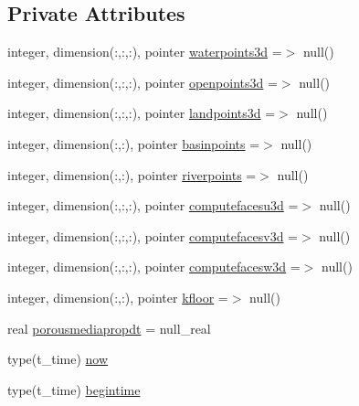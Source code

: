 \subsection*{Private Attributes}
\begin{DoxyCompactItemize}
\item 
integer, dimension(\+:,\+:,\+:), pointer \mbox{\hyperlink{structmoduleporousmediaproperties_1_1t__extvar_a78329eea7d2b60358e14da7512fa68bc}{waterpoints3d}} =$>$ null()
\item 
integer, dimension(\+:,\+:,\+:), pointer \mbox{\hyperlink{structmoduleporousmediaproperties_1_1t__extvar_ab5599d3df3801a6a22dce6e4331dbeac}{openpoints3d}} =$>$ null()
\item 
integer, dimension(\+:,\+:,\+:), pointer \mbox{\hyperlink{structmoduleporousmediaproperties_1_1t__extvar_aead11455a918c9ba540a3c1712b14219}{landpoints3d}} =$>$ null()
\item 
integer, dimension(\+:,\+:), pointer \mbox{\hyperlink{structmoduleporousmediaproperties_1_1t__extvar_ae47a697da9946c21b34ebcd4e989f691}{basinpoints}} =$>$ null()
\item 
integer, dimension(\+:,\+:), pointer \mbox{\hyperlink{structmoduleporousmediaproperties_1_1t__extvar_aaf9c3cb36dc6335e47a00b998ee47c8a}{riverpoints}} =$>$ null()
\item 
integer, dimension(\+:,\+:,\+:), pointer \mbox{\hyperlink{structmoduleporousmediaproperties_1_1t__extvar_a37882913815ed2448c0acb08b6f95809}{computefacesu3d}} =$>$ null()
\item 
integer, dimension(\+:,\+:,\+:), pointer \mbox{\hyperlink{structmoduleporousmediaproperties_1_1t__extvar_a555a5982038bf660378155f06452b8fb}{computefacesv3d}} =$>$ null()
\item 
integer, dimension(\+:,\+:,\+:), pointer \mbox{\hyperlink{structmoduleporousmediaproperties_1_1t__extvar_a8d7ce29f907d0e1a507c8978234e3d21}{computefacesw3d}} =$>$ null()
\item 
integer, dimension(\+:,\+:), pointer \mbox{\hyperlink{structmoduleporousmediaproperties_1_1t__extvar_a89c3ca6ada2e605b8beb58823e8212b2}{kfloor}} =$>$ null()
\item 
real \mbox{\hyperlink{structmoduleporousmediaproperties_1_1t__extvar_a3461bc54bee15a446caceb80bff78fd0}{porousmediapropdt}} = null\+\_\+real
\item 
type(t\+\_\+time) \mbox{\hyperlink{structmoduleporousmediaproperties_1_1t__extvar_afa6499dbd441c34f7aa307804579276f}{now}}
\item 
type(t\+\_\+time) \mbox{\hyperlink{structmoduleporousmediaproperties_1_1t__extvar_a354f8f645c5049dfd0bd0eedaf7f6ecb}{begintime}}

\end{DoxyCompactItemize}
